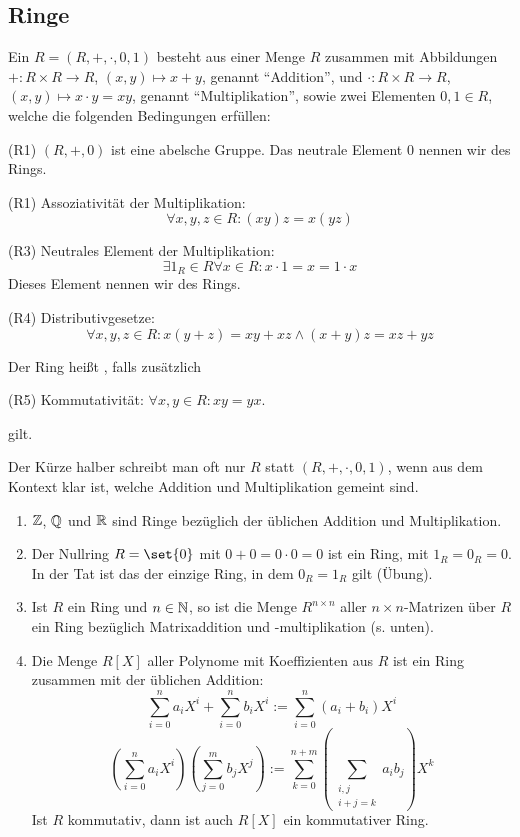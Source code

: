 
\subsection{Ringe}\label{sec:rings}
\begin{definition}
    Ein  $R=(R,+,\cdot,0,1)$ besteht aus einer Menge $R$ zusammen mit Abbildungen ${+} : R \times R \to R$, $(x,y) \mapsto x+y$, genannt \enquote{Addition}, und $\cdot : R\times R \to R$, $(x,y) \mapsto x\cdot y = xy$, genannt \enquote{Multiplikation}, sowie zwei Elementen $0,1\in R$, welche die folgenden Bedingungen erfüllen:
    \begin{description}
        \item{(R1)} $(R,+,0)$ ist eine abelsche Gruppe. Das neutrale Element $0$ nennen wir  des Rings.
        \item{(R1)} Assoziativität der Multiplikation:
        \[\forall x,y,z\in R: (xy)z = x(yz)\]
        \item{(R3)} Neutrales Element der Multiplikation:
        \[\exists 1_R\in R \forall x\in R: x\cdot 1=x=1\cdot x\]
        Dieses Element nennen wir  des Rings.
        \item{(R4)} Distributivgesetze:
        \[\forall x,y,z\in R: x(y+z)=xy+xz \wedge (x+y)z=xz+yz\]
    \end{description}
    Der Ring heißt , falls zusätzlich
    \begin{description}
        \item{(R5)} Kommutativität: $\forall x,y\in R: xy=yx$.
    \end{description}
    gilt.

    Der Kürze halber schreibt man oft nur $R$ statt $(R,+,\cdot,0,1)$, wenn aus dem Kontext klar ist, welche Addition und Multiplikation gemeint sind.
\end{definition}

\begin{example}
    \begin{enumerate}
        \item $\mathbb{Z}$, $\mathbb{Q}$ und $\mathbb{R}$ sind Ringe bezüglich der üblichen Addition und
        Multiplikation.
        \item Der Nullring $R=\set{0}$ mit $0+0=0\cdot0=0$ ist ein Ring, mit $1_R=0_R=0$. In der Tat ist das der einzige Ring, in dem $0_R=1_R$ gilt (Übung).
        \item Ist $R$ ein Ring und $n\in\mathbb{N}$, so ist die Menge $R^{n\times n}$ aller $n\times n$-Matrizen über $R$ ein Ring bezüglich Matrixaddition und -multiplikation (s. unten).
        \item Die Menge $R[X]$ aller Polynome mit Koeffizienten aus $R$ ist ein
        Ring zusammen mit der üblichen Addition:
        \[\sum_{i=0}^n a_i X^i + \sum_{i=0}^n b_i X^i := \sum_{i=0}^{n} (a_i+b_i)X^i\]
        \[(\sum_{i=0}^n a_i X^i)(\sum_{j=0}^m b_j X^j) := \sum_{k=0}^{n+m} (\sum_{\substack{i,j \\ i+j=k}} a_i b_j) X^k\]
        Ist $R$ kommutativ, dann ist auch $R[X]$ ein kommutativer Ring.
    \end{enumerate}
\end{example}

